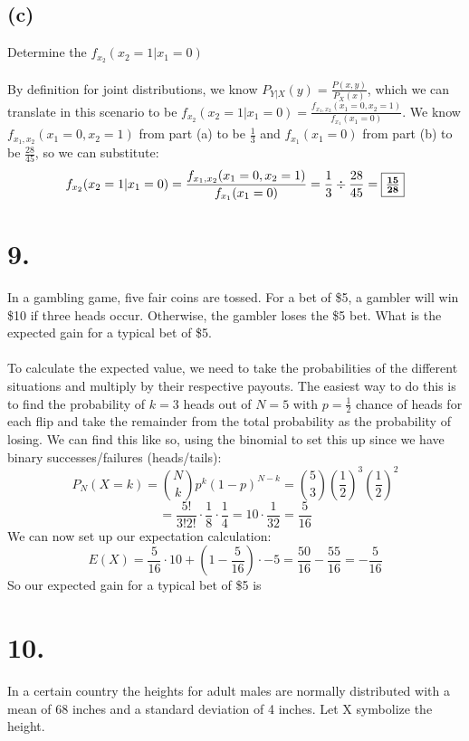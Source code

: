 \documentclass{article}
\begin{document}
{\subsection*{(c)} 
Determine the \( f_{x_2} (x_2 = 1 | x_1 = 0) \) 
\\
\\
By definition for joint distributions, we know \(P_{Y|X}(y) = \frac{P(x,y)}{P_X(x)}\), which we can translate in this scenario to be \( f_{x_2} (x_2 = 1 | x_1 = 0) = \frac{f_{x_1, x_2} (x_1 = 0, x_2 = 1)}{f_{x_1} (x_1 = 0)} \). We know \( f_{x_1, x_2} (x_1 = 0, x_2 = 1) \) from part (a) to be \( \frac{1}{3} \) and \( f_{x_1} (x_1 = 0) \) from part (b) to be \( \frac{28}{45} \), so we can substitute:
\[
f_{x_2} (x_2 = 1 | x_1 = 0) = \frac{f_{x_1, x_2} (x_1 = 0, x_2 = 1)}{f_{x_1} (x_1 = 0)} = \frac{1}{3} \div \frac{28}{45} = \fbox{\(\mathbf{ \frac{15}{28} }\)}
\]

\section*{9.}
In a gambling game, five fair coins are tossed. For a bet of \$5, a gambler will win \$10 if three heads occur. Otherwise, the gambler loses the \$5 bet. What is the expected gain for a typical bet of \$5.
\\
\\
To calculate the expected value, we need to take the probabilities of the different situations and multiply by their respective payouts. The easiest way to do this is to find the probability of \(k=3\) heads out of \(N=5\) with \(p=\frac{1}{2}\) chance of heads for each flip and take the remainder from the total probability as the probability of losing. We can find this like so, using the binomial to set this up since we have binary successes/failures (heads/tails):
\[
P_N(X=k) = \binom{N}{k}p^k{(1-p)}^{N-k} = \binom{5}{3} {(\frac{1}{2})}^3 {(\frac{1}{2})}^2
\]
\[
= \frac{5!}{3!2!} \cdot \frac{1}{8} \cdot \frac{1}{4} = 10 \cdot \frac{1}{32} = \frac{5}{16}
\]
We can now set up our expectation calculation:
\[
E(X) = \frac{5}{16} \cdot 10 + (1 - \frac{5}{16}) \cdot -5 = \frac{50}{16} - \frac{55}{16} = -\frac{5}{16}
\]
So our expected gain for a typical bet of \$5 is 

\section*{10.}
In a certain country the heights for adult males are normally distributed with a mean of 68 inches and a standard deviation of 4 inches. Let X symbolize the height.

}
\end{document}
